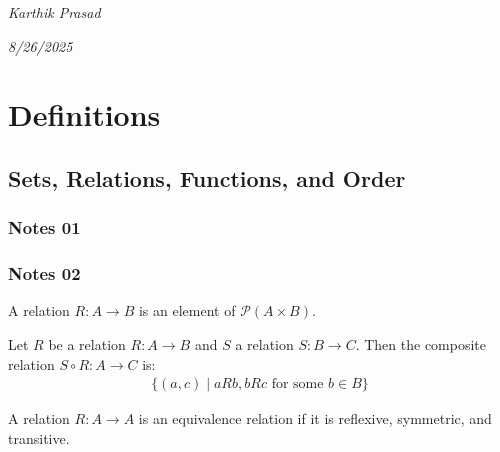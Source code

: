 \documentclass[12pt,letterpaper,reqno]{article}
\begin{document}
\pagestyle{fancy}
\renewcommand{\headrulewidth}{0.5pt}

\begin{center}

\textit{Karthik Prasad}

\textit{8/26/2025}

\end{center}

\tableofcontents

\newpage
\section{Definitions}

\subsection{Sets, Relations, Functions, and Order}

\subsubsection{Notes 01}

\subsubsection{Notes 02}

\begin{definition}[Relation]\label{def:relation}
    A relation $R: A \to B$ is an element of $\mathcal{P}(A \times B)$.
\end{definition}

\begin{definition}\label{def:composite-relation}
    Let $R$ be a relation $R: A \to B$ and $S$ a relation $S: B \to C$. Then the composite relation $S \circ R: A \to C$ is:
    \begin{align*}
        \{(a, c) \mid aRb, bRc \text{ for some } b \in B \}
    \end{align*}
\end{definition}

\begin{definition}\label{def:equivalence-relation}
    A relation $R: A \to A$ is an equivalence relation if it is reflexive, symmetric, and transitive.
\end{definition}
\end{document}
